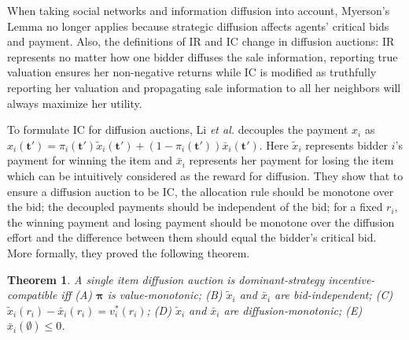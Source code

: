 \documentclass{article}
\newtheorem{theorem}{Theorem}
\begin{document}
When taking social networks and information diffusion into account, Myerson's Lemma no longer applies because strategic diffusion affects agents' critical bids and payment. Also, the definitions of IR and IC change in diffusion auctions: IR represents no matter how one bidder diffuses the sale information, reporting true valuation ensures her non-negative returns while IC is modified as truthfully reporting her valuation and propagating sale information to all her neighbors will always maximize her utility. 

To formulate IC for diffusion auctions, Li \emph{et al.}  decouples the payment $x_i$ as $x_i(\mathbf{t}')=\pi_i(\mathbf{t}')\tilde{x}_i(\mathbf{t}')+(1-\pi_i(\mathbf{t}'))\bar{x}_i(\mathbf{t}')$. Here $\tilde{x}_i$ represents bidder $i$'s payment for winning the item and $\bar{x}_i$ represents her payment for losing the item which can be intuitively considered as the reward for diffusion. They show that to ensure a diffusion auction to be IC, the allocation rule should be monotone over the bid; the decoupled payments should be independent of the bid; for a fixed $r_i$, the winning payment and losing payment should be monotone over the diffusion effort and the difference between them should equal the bidder's critical bid. More formally, they proved the following theorem.
\begin{theorem}\label{t1}
A single item diffusion auction is dominant-strategy incentive-compatible iff (A) $\boldsymbol{\pi}$ is value-monotonic;
(B) $\tilde{x}_i$ and $\bar{x}_i$ are bid-independent;
(C) $\tilde{x}_i(r_i)- \bar{x}_i(r_i)=v^\ast_i(r_i)$;
(D) $\tilde{x}_i$ and $\bar{x}_i$ are diffusion-monotonic;
(E) $\bar{x}_i(\emptyset) \leq 0$.
\end{theorem}


\end{document}
